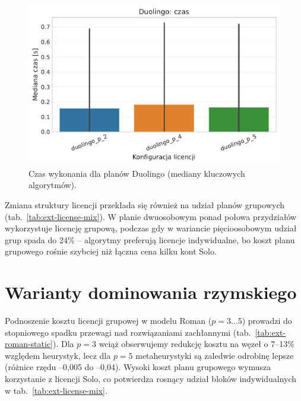 \begin{figure}[H]
  \centering
  \includegraphics[width=0.6\linewidth]{assets/figures/extensions/static/duolingo_time_comparison.pdf}
  \caption{Czas wykonania dla planów Duolingo (mediany kluczowych algorytmów).}
  \label{fig:ext-duolingo-time}
\end{figure}

Zmiana struktury licencji przekłada się również na udział planów grupowych (tab.~\ref{tab:ext-license-mix}). W planie dwuosobowym ponad połowa przydziałów wykorzystuje licencję grupową, podczas gdy w wariancie pięcioosobowym udział grup spada do 24\% -- algorytmy preferują licencje indywidualne, bo koszt planu grupowego rośnie szybciej niż łączna cena kilku kont Solo.

\section{Warianty dominowania rzymskiego}

Podnoszenie kosztu licencji grupowej w modelu Roman ($p=3\ldots5$) prowadzi do stopniowego spadku przewagi nad rozwiązaniami zachłannymi (tab.~\ref{tab:ext-roman-static}). Dla $p=3$ wciąż obserwujemy redukcję kosztu na węzeł o 7--13\% względem heurystyk, lecz dla $p=5$ metaheurystyki są zaledwie odrobinę lepsze (różnice rzędu –0,005 do –0,04). Wysoki koszt planu grupowego wymusza korzystanie z licencji Solo, co potwierdza rosnący udział bloków indywidualnych w tab.~\ref{tab:ext-license-mix}.

